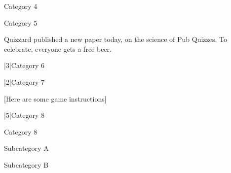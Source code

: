 \documentclass[host,printbonus]{pubQuiz} %
\begin{document}
		\begin{PubCategory}{Category 4}
		\end{PubCategory}
		
		\begin{PubCategory}{Category 5}
		\end{PubCategory}
		
	\begin{PubInstructions}
		\item Quizzard published a new paper today, on the science of Pub Quizzes. To celebrate, everyone gets a free beer.
	\end{PubInstructions}
		\begin{PubCategory}|3|{Category 6}
		\end{PubCategory}
		
		\begin{PubCategory}|2|{Category 7}
		\end{PubCategory}

		[Here are some game instructions]
		
		\begin{PubCategory}|5|{Category 8}
		\end{PubCategory}
		
		\begin{PubCategory}{Category 8}
			\begin{PubSubcategory}{Subcategory A}
			\end{PubSubcategory}
			\begin{PubSubcategory}{Subcategory B}
			\end{PubSubcategory}
		\end{PubCategory}
\end{document}
